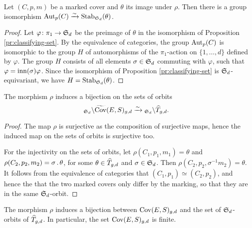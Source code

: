 \begin{prop} \label{prop:correspondence-automorphism-group}
 Let $(C,p,m)$ be a marked cover and $\theta$ its image under $\rho$. Then there is a group isomorphism $\operatorname{Aut}_p(C)\xrightarrow{\sim} \operatorname{Stab}_{\operatorname{\mathfrak{S}}_d}(\theta)$.
\end{prop}

\begin{proof}
 Let $\varphi\colon\pi_1\to \operatorname{\mathfrak{S}}_d$ be the preimage of $\theta$ in the isomorphism of Proposition \ref{pr:classifying-set}. By the equivalence of categories, the group $\operatorname{Aut}_p(C)$ is isomorphic to the group $H$ of automorphisms of the $\pi_1$-action on $\{1,\dotsc,d\}$ defined by $\varphi$. The group $H$ consists of all elements $\sigma\in\operatorname{\mathfrak{S}}_d$ commuting with $\varphi$, \ie such that $\varphi = \operatorname{inn}(\sigma)\varphi$. Since the isomorphism of Proposition \ref{pr:classifying-set} is $\operatorname{\mathfrak{S}}_d$-equivariant, we have $H=\operatorname{Stab}_{\operatorname{\mathfrak{S}}_d}(\theta)$.
\end{proof}


\begin{prop} \label{prop:classification-of-covers}
 The morphism $\rho$ induces a bijection on the sets of orbits
 \[{_{\operatorname{\mathfrak{S}}_d}\backslash\widetilde{\operatorname{Cov}}(E,S)_{g,d}}\xrightarrow{\sim} {_{\operatorname{\mathfrak{S}}_d}\backslash\widehat{T}_{g,d}.}\] 
 
\end{prop}

\begin{proof}
 The map $\rho$ is surjective as the composition of surjective maps, hence the induced map on the sets of orbits is surjective too.
 
 For the injectivity on the sets of orbits, let $\rho(C_1,p_1,m_1)=\theta$ and $\rho(C_2,p_2,m_2)=\sigma\,.\, \theta$, for some $\theta\in \widehat{T}_{g,d}$ and $\sigma \in \operatorname{\mathfrak{S}}_d$. Then $\rho(C_2,p_2,\sigma^{-1}m_2)=\theta$. It follows from the equivalence of categories that $(C_1,p_1)\simeq (C_2,p_2)$, and hence the that the two marked covers only differ by the marking, so that they are in the same $\operatorname{\mathfrak{S}}_d$-orbit.
\end{proof}

\begin{cor} \label{pr:final-classification}
 The morphism $\rho$ induces a bijection between $\operatorname{Cov}(E,S)_{g,d}$ and the set of $\operatorname{\mathfrak{S}}_d$-orbits of $\widehat{T}_{g,d}$. In particular, the set $\operatorname{Cov}(E,S)_{g,d}$ is finite.
\end{cor}

